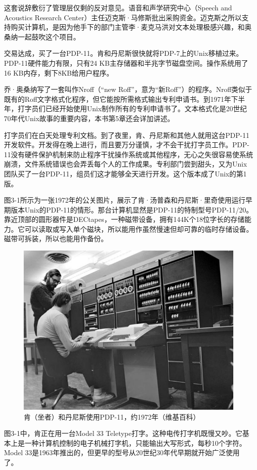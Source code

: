 \documentclass[a4paper,12pt,UTF8,twoside]{ctexbook}
\begin{document}
这套说辞敷衍了管理层仅剩的反对意见。语音和声学研究中心（Speech and Acoustics Research Center）主任迈克斯·马修斯批出采购资金。迈克斯之所以支持购买计算机，是因为他手下的部门主管李·麦克马洪对文本处理极感兴趣，和奥桑纳一起鼓吹这个项目。

交易达成，买了一台PDP-11。肯和丹尼斯很快就将PDP-7上的Unix移植过来。PDP-11硬件能力有限，只有24 KB主存储器和半兆字节磁盘空间。操作系统用了16 KB内存，剩下8KB给用户程序。

乔·奥桑纳写了一套叫作Nroff（“new Roff”，意为“新Roff”）的程序。Nroff类似于既有的Roff文字格式化程序，但它能按所需格式输出专利申请书。到1971年下半年，打字员们已经开始使用Unix制作所有的专利申请书了。文本格式化是20世纪70年代Unix故事的重要内容，本书第5章还会详加讲述。

打字员们在白天处理专利文档。到了夜里，肯、丹尼斯和其他人就用这台PDP-11开发软件。开发得在晚上进行，而且要万分谨慎，才不会干扰打字员工作。PDP-11没有硬件保护机制来防止程序干扰操作系统或其他程序，无心之失很容易使系统崩溃，文件系统错误也会弄丢每个人的工作成果。专利部门尝到甜头，又为Unix团队买了一台PDP-11，组员们这才能够全天进行开发。这个版本成了Unix的第1版。

图3-1所示为一张1972年的公关图片，展示了肯·汤普森和丹尼斯·里奇使用运行早期版本Unix的PDP-11的情形。那台计算机显然是PDP-11的特制型号PDP-11/20。靠近顶部的圆形器件是DECtapes，一种磁带设备，拥有144K个18位字长的存储能力。它可以读取或写入单个磁块，所以能用作虽然慢速但却可靠的临时存储设备。磁带可拆装，所以也能用作备份。

\begin{figure}[htbp]
	\centering
	\includegraphics[width=0.7\linewidth]{19}
	\caption{肯（坐者）和丹尼斯使用PDP-11，约1972年（维基百科）}
	\label{fig:1}
\end{figure}

图3-1中，肯正在用一台Model 33 Teletype打字。这种电传打字机既慢又吵。它基本上是一种计算机控制的电子机械打字机，只能输出大写形式，每秒10个字符。Model 33是1963年推出的，但更早的型号从20世纪30年代早期就开始广泛使用了。
\end{document}
